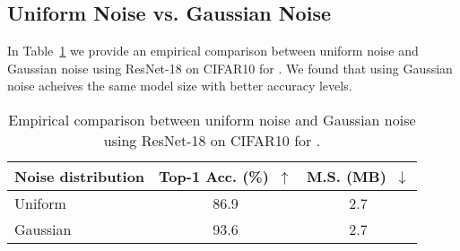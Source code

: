 \subsection{Uniform Noise vs. Gaussian Noise}
In Table~\ref{supp:noise} we provide an empirical comparison between uniform noise and Gaussian noise using ResNet-18 on CIFAR10 for \diffq. We found that using Gaussian noise acheives the same model size with better accuracy levels.

\begin{table}[t!]
\caption{Empirical comparison between uniform noise and Gaussian noise using ResNet-18 on CIFAR10 for \diffq.}
\label{supp:noise}
\vskip 0.15in
\begin{center}
\begin{small}
\begin{sc}
\begin{tabular}{l|cc}
\toprule
		Noise distribution & Top-1 Acc. (\%)~$\uparrow$ & M.S. (MB)~$\downarrow$ \\
\midrule
Uniform  	    & 86.9      & 2.7 \\
Gaussian  	    & 93.6      & 2.7  \\
\bottomrule
\end{tabular}
\end{sc}
\end{small}
\end{center}
\end{table}
